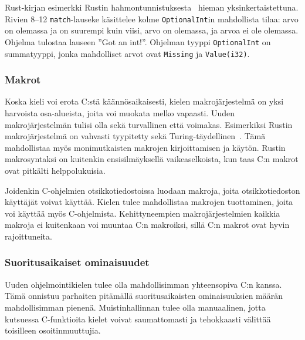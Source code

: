 \FloatBarrier

\begin{listing}[ht!]
    \inputminted{Rust}{guards.rs}
    \caption{Rust-kirjan esimerkki Rustin
    hahmontunnistuksesta~\citep{rustguards} hieman yksinkertaistettuna. Rivien
    8--12 \texttt{match}-lauseke käsittelee kolme \texttt{OptionalInt}in
    mahdollista tilaa: arvo on olemassa ja on suurempi kuin viisi, arvo on
    olemassa, ja arvoa ei ole olemassa. Ohjelma tulostaa lauseen ''Got an
    int!''. Ohjelman tyyppi \texttt{OptionalInt} on summatyyppi, jonka
    mahdolliset arvot ovat \texttt{Missing} ja \texttt{Value(i32)}.}
    \label{fig:guards}
\end{listing}

\FloatBarrier

\subsubsection{Makrot}

Koska kieli voi erota C:stä käännösaikaisesti, kielen makrojärjestelmä on yksi
harvoista osa-alueista, joita voi muokata melko vapaasti. Uuden
makrojärjestelmän tulisi olla sekä turvallinen että voimakas. Esimerkiksi
Rustin makrojärjestelmä on vahvasti tyypitetty sekä
Turing-täydellinen~\citep{rustmacros}. Tämä mahdollistaa myös monimutkaisten
makrojen kirjoittamisen ja käytön. Rustin makrosyntaksi on kuitenkin
ensisilmäyksellä vaikeaselkoista, kun taas C:n makrot ovat pitkälti
helppolukuisia.

Joidenkin C-ohjelmien otsikkotiedostoissa luodaan makroja, joita
otsikkotiedoston käyttäjät voivat käyttää. Kielen tulee mahdollistaa makrojen
tuottaminen, joita voi käyttää myös C-ohjelmista. Kehittyneempien
makrojärjestelmien kaikkia makroja ei kuitenkaan voi muuntaa C:n makroiksi,
sillä C:n makrot ovat hyvin rajoittuneita.

\subsubsection{Suoritusaikaiset ominaisuudet}

Uuden ohjelmointikielen tulee olla mahdollisimman yhteensopiva C:n kanssa. Tämä
onnistuu parhaiten pitämällä suoritusaikaisten ominaisuuksien määrän mahdollisimman
pienenä. Muistinhallinnan tulee olla manuaalinen, jotta kutsuessa C-funktioita
kielet voivat saumattomasti ja tehokkaasti välittää toisilleen
osoitinmuuttujia.

